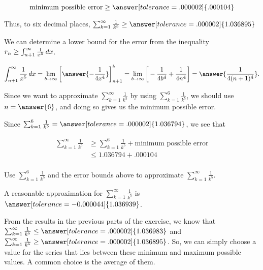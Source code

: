 \documentclass{ximera}
\begin{document}
\begin{exercise}
\begin{exercise}
\[
\textrm{minimum possible error} \geq \answer[tolerance=.000002]{.000104}
\]

Thus, to six decimal places, $\sum_{k=1}^{\infty} \frac{1}{k^5} \geq \answer[tolerance=.000002]{ 1.036895}$

\begin{hint}
We can determine a lower bound for the error from the inequality $ r_n \geq \int_{n+1}^{\infty} \frac{1}{x^5} \mathop{}\!d x$. 

\[
\int_{n+1}^\infty \frac{1}{x^5} \d x = \lim_{b \to \infty} \eval{\answer{-\frac{1}{4x^4}}}_{n+1}^b = \lim_{b \to \infty} \eval{-\frac{1}{4b^4}+\frac{1}{4n^4}} =\answer{\frac{1}{4(n+1)^4}}. 
\]

Since we want to approximate $\sum_{k=1}^{\infty} \frac{1}{k^5}$ by using $\sum_{k=1}^{6} \frac{1}{k^5}$, we should use $n=\answer{6}$, and doing so gives us the minimum possible error.

Since $\sum_{k=1}^{6} \frac{1}{k^5} = \answer[tolerance=.000002]{1.036794}$, we see that 

\begin{align*}
\sum_{k=1}^{\infty} \frac{1}{k^5} & \geq \sum_{k=1}^{6} \frac{1}{k^5} + \textrm{minimum possible error} \\
& \leq 1.036794 + .000104 \\
\end{align*}

\end{hint}
\end{exercise}

\begin{exercise}
Use $\sum_{k=1}^{6} \frac{1}{k^5}$ and the error bounds above to approximate $\sum_{k=1}^{\infty} \frac{1}{k^5}$.

A reasonable approximation for $\sum_{k=1}^{\infty} \frac{1}{k^5}$ is $\answer[tolerance=-0.000044]{1.036939}$.

\begin{hint}
From the results in the previous parts of the exercise, we know that  $\sum_{k=1}^{\infty} \frac{1}{k^5} \leq \answer[tolerance=.000002]{1.036983}$ and $\sum_{k=1}^{\infty} \frac{1}{k^5} \geq \answer[tolerance=.000002]{ 1.036895}$.  So, we can simply choose a value for the series that lies between these minimum and maximum possible values.  A common choice is the average of them.


\end{hint}
\end{exercise}


\end{exercise}
\end{document}
